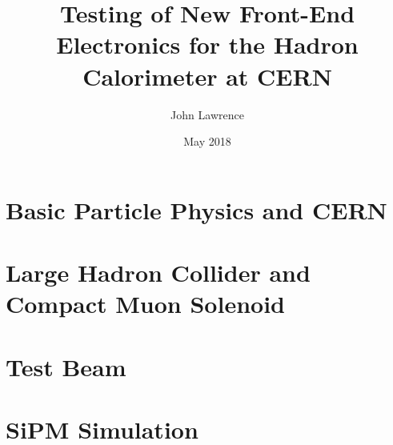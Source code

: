 \documentclass
[]
{thesis}
\title{Testing of New Front-End Electronics for the Hadron Calorimeter at CERN}
\author{John Lawrence}
\date{May 2018}
\begin{document}
	
\chapter{Basic Particle Physics and CERN}
\label{chap:intro}


\chapter{Large Hadron Collider and Compact Muon Solenoid}
\label{chap:LHC_CMS}


\chapter{Test Beam}
\label{chap:test}


\chapter{SiPM Simulation}
\label{chap:sim}

\end{document}
